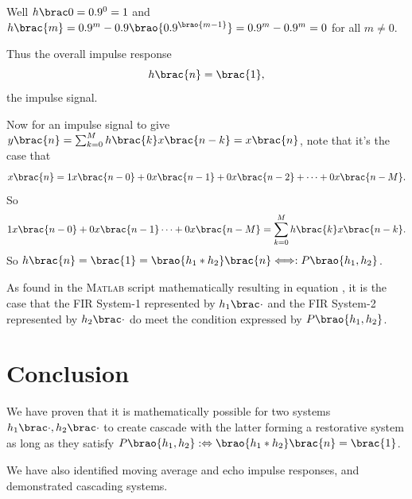 \documentclass[conference]{../lib/IEEEtran}
\DeclarePairedDelimiter\brao()%
\DeclarePairedDelimiter\brac[]%
\newcommand*\tbrao[1]{(#1)}
\begin{document}
Well \(h\brac0 = 0.9^0 = 1\) and \(h\brac{m} = 0.9^m - 0.9\brao{0.9^{\brao{m - 1}}} = 0.9^m - 0.9^m = 0\) for all \(m \not= 0\).

Thus the overall impulse response \begin{eqnarray}h\brac{n} = \brac{\begin{matrix} 1 \end{matrix}},\label{eqn:hn-1}\end{eqnarray} the impulse signal.

Now for an impulse signal to give \(y\brac{n} = \sum_{k=0}^M h\brac{k}x\brac{n-k} = x\brac{n}\), note that it's the case that
\[
x\brac{n} = 1x\brac{n-0} + 0x\brac{n-1} + 0x\brac{n-2} + \cdots + 0x\brac{n-M}.
\]
So \[1x\brac{n-0} + 0x\brac{n-1} \cdots + 0x\brac{n-M} = \sum_{k=0}^M h\brac{k}x\brac{n-k}. \]
So \(h\brac{n} = \brac{\begin{matrix}1\end{matrix}} = \brao{h_1\ast h_2}\brac{n} \Longleftrightarrow: P\brao{h_1, h_2}\).

As found in the \textsc{Matlab} script mathematically resulting in equation \tbrao{\ref{eqn:hn-1}}, it is the case that the FIR System-1 represented by \(h_1\brac\cdot\) and the FIR System-2 represented by \(h_2\brac\cdot\) do meet the condition expressed by \(P\brao{h_1,h_2}\).

\section{Conclusion}

We have proven that it is mathematically possible for two systems \(h_1\brac\cdot, h_2\brac\cdot\) to create cascade with the latter forming a restorative system as long as they satisfy \(P\brao{h_1, h_2} :\Leftrightarrow \brao{h_1\ast h_2}\brac{n} = \brac{\begin{matrix}1\end{matrix}}\).

We have also identified moving average and echo impulse responses, and demonstrated cascading systems.
\end{document}
